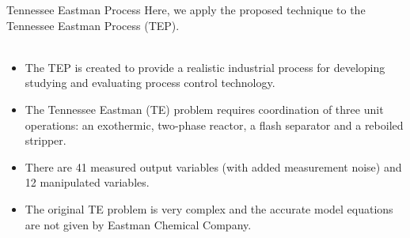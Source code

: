 \documentclass[10pt]{beamer}
\begin{document}
  \begin{frame}{Tennessee Eastman Process}
    Here, we apply the proposed technique to the Tennessee Eastman Process (TEP).\\~\\
    \begin{itemize}
    \item The TEP is created to provide a realistic industrial process for developing studying and evaluating process control technology. 
    \item The Tennessee Eastman (TE) problem requires coordination of three unit operations: an exothermic, two-phase reactor, a flash separator and a reboiled  stripper.
    \item There are 41 measured output variables (with added measurement noise) and 12 manipulated variables.
    \item The original TE problem is very complex and the accurate model equations are not given by Eastman Chemical Company.   
    \end{itemize}
  \end{frame}
\end{document}
